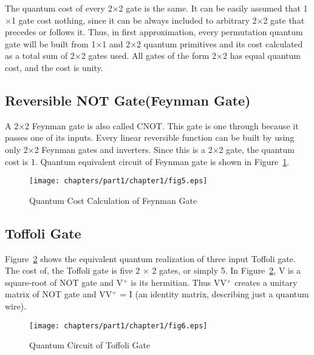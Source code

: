 \begin{property}\textnormal{
	The quantum cost of every 2$\times$2 gate is the same. It can be easily assumed that 1$\times$1 gate cost nothing, since it can be always included to arbitrary 2$\times$2 gate that precedes or follows it. Thus, in first approximation, every permutation quantum gate will be built from 1$\times$1 and 2$\times$2 quantum primitives and its cost calculated as a total sum of 2$\times$2 gates used. All gates of the form 2$\times$2 has equal quantum cost, and the cost is unity.}
\end{property}

\subsection{Reversible NOT Gate(Feynman Gate)}

\begin{example}\textnormal{
	A 2$\times$2 Feynman gate is also called CNOT. This gate is one through because it passes one of its inputs. Every linear reversible function can be built by using only 2$\times$2 Feynman gates and inverters. Since this is a 2$\times$2 gate, the quantum cost is 1. Quantum equivalent circuit of Feynman gate is shown in Figure~\ref{fig:p1_c1_fig5}.}
\end{example}

\begin{figure}[h]
	\centering
	\texttt{[image: chapters/part1/chapter1/fig5.eps]}
	\caption{Quantum Cost Calculation of Feynman Gate}
	\label{fig:p1_c1_fig5}
\end{figure}

\subsection{Toffoli Gate}
	Figure~\ref{fig:p1_c1_fig6} shows the equivalent quantum realization of three input Toffoli gate. The cost of, the Toffoli gate is five 2 $\times$ 2 gates, or simply 5. In Figure~\ref{fig:p1_c1_fig6}, V is a square-root of NOT gate and V$^+$ is its hermitian. Thus VV$^+$ creates a unitary matrix of NOT gate and VV$^+$ = I (an identity matrix, describing just a quantum wire).
	
	\begin{figure}[h]
		\centering
		\texttt{[image: chapters/part1/chapter1/fig6.eps]}
		\caption{Quantum Circuit of Toffoli Gate}
		\label{fig:p1_c1_fig6}
	\end{figure}

